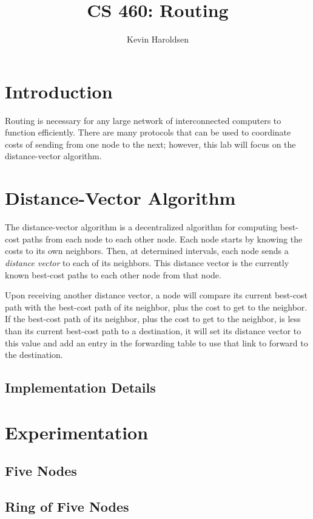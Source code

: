 \documentclass[fleqn,11pt]{article}
\title{CS 460: Routing}
\author{Kevin Haroldsen}
\date{}
\begin{document}
\maketitle

\section{Introduction}
Routing is necessary for any large network of interconnected computers to function efficiently.
There are many protocols that can be used to coordinate costs of sending from one node to the next; however, this lab will focus on the distance-vector algorithm.

\section{Distance-Vector Algorithm}
The distance-vector algorithm is a decentralized algorithm for computing best-cost paths from each node to each other node.
Each node starts by knowing the costs to its own neighbors.
Then, at determined intervals, each node sends a \textit{distance vector} to each of its neighbors.
This distance vector is the currently known best-cost paths to each other node from that node.

Upon receiving another distance vector, a node will compare its current best-cost path with the best-cost path of its neighbor, plus the cost to get to the neighbor.
If the best-cost path of its neighbor, plus the cost to get to the neighbor, is less than its current best-cost path to a destination, it will set its distance vector to this value and add an entry in the forwarding table to use that link to forward to the destination.

\subsection{Implementation Details}


\section{Experimentation}

\subsection{Five Nodes}

\subsection{Ring of Five Nodes}
\end{document}
